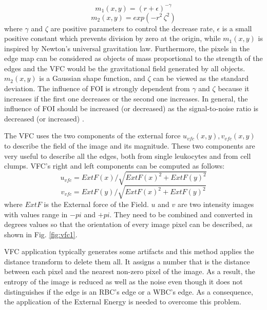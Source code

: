 {	\begin{equation}
	{m} _{1} ( x,y ) =(r+\epsilon) ^{-\gamma}
	\end{equation}
	\begin{equation}
	{m} _{2} ( x,y ) =exp(-r^{2}\, \zeta ^{2})
	\end{equation}
	where $\gamma$ and $\zeta$ are positive parameters to control the decrease rate, $\epsilon$ is a small positive constant which prevents division by zero at the origin, while ${m} _{1} ( x,y )$ is inspired by Newton's universal gravitation law. Furthermore, the pixels in the edge map can be considered as objects of mass proportional to the strength of the edges and the VFC would be the gravitational field generated by all objects. 
	${m} _{2} ( x,y )$ is a Gaussian shape function, and $\zeta$ can be viewed as the standard deviation.
	The influence of FOI is strongly dependent from $\gamma$ and $\zeta$ because it increases if the first one decreases or the second one increases. 
	In general, the influence of FOI should be increased (or decreased) as the signal-to-noise ratio is decreased (or increased) \cite{Bing}.
	
	The VFC uses the two components of the external force ${u} _{vfc} ( x,y ) , {v} _{vfc} (x,y)$ to describe the field of the image and its magnitude. These two components are very useful to describe all the edges, both from single leukocytes and from cell clumps. VFC's right and left components can be computed as follows:
	\begin{equation}
	{u} _{vfc}=ExtF(x)/\sqrt{ExtF(x)^{2} + ExtF(y)^{2}}
	\end{equation}
	\begin{equation}
	{v} _{vfc}=ExtF(y)/\sqrt{ExtF(x)^{2} + ExtF(y)^{2}}
	\end{equation}
	where $ExtF$ is the External force of the Field. $u$ and $v$ are two intensity images with values range in $-pi$ and $+pi$. They need to be combined and converted in degrees values so that the orientation of every image pixel can be described, as shown in Fig. \ref{fig:vfc1}. 
	
	VFC application typically generates some artifacts and this method applies the distance transform to delete them all. It assigns a number that is the distance between each pixel and the nearest non-zero pixel of the image. As a result, the entropy of the image is reduced as well as the noise even though it does not distinguishes if the edge is an RBC's edge or a WBC's edge. As a consequence, the application of the External Energy is needed to overcome this problem.
	
}
